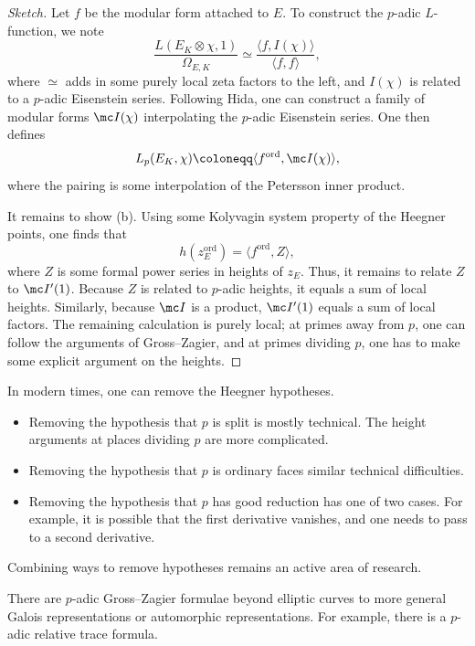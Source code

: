 \documentclass{article}
\begin{document}
\begin{proof}[Sketch]
	Let $f$ be the modular form attached to $E$. To construct the $p$-adic $L$-function, we note
	\[\frac{L(E_K\otimes\chi,1)}{\Omega_{E,K}}\simeq\frac{\langle f,I(\chi)\rangle}{\langle f,f\rangle},\]
	where $\simeq$ adds in some purely local zeta factors to the left, and $I(\chi)$ is related to a $p$-adic Eisenstein series. Following Hida, one can construct a family of modular forms $\mc I(\chi)$ interpolating the $p$-adic Eisenstein series. One then defines
	\[L_p(E_K,\chi)\coloneqq\langle f^{\mathrm{ord}},\mc I(\chi)\rangle,\]
	where the pairing is some interpolation of the Petersson inner product.

	It remains to show (b). Using some Kolyvagin system property of the Heegner points, one finds that
	\[h(z_E^{\mathrm{ord}})=\langle f^{\mathrm{ord}},Z\rangle,\]
	where $Z$ is some formal power series in heights of $z_E$. Thus, it remains to relate $Z$ to $\mc I'(1)$. Because $Z$ is related to $p$-adic heights, it equals a sum of local heights. Similarly, because $\mc I$ is a product, $\mc I'(1)$ equals a sum of local factors. The remaining calculation is purely local; at primes away from $p$, one can follow the arguments of Gross--Zagier, and at primes dividing $p$, one has to make some explicit argument on the heights.
\end{proof}
\begin{remark}
	In modern times, one can remove the Heegner hypotheses.
	\begin{itemize}
		\item Removing the hypothesis that $p$ is split is mostly technical. The height arguments at places dividing $p$ are more complicated.
		\item Removing the hypothesis that $p$ is ordinary faces similar technical difficulties.
		\item Removing the hypothesis that $p$ has good reduction has one of two cases. For example, it is possible that the first derivative vanishes, and one needs to pass to a second derivative.
	\end{itemize}
	Combining ways to remove hypotheses remains an active area of research.
\end{remark}
\begin{remark}
	There are $p$-adic Gross--Zagier formulae beyond elliptic curves to more general Galois representations or automorphic representations. For example, there is a $p$-adic relative trace formula.
\end{remark}
\end{document}

